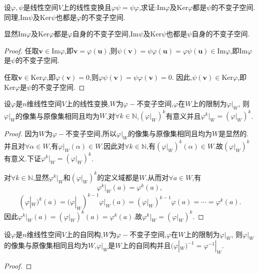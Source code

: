 \documentclass[../../main.tex]{subfiles}
\begin{document}
\begin{proposition}\label{proposition:乘法可交换的线性变换值域和核互为不变子空间}
设\(\varphi,\psi\)是线性空间\(V\)上的线性变换且\(\varphi\psi = \psi\varphi\),求证:\(\text{Im}\varphi\)及\(\text{Ker}\varphi\)都是\(\psi\)的不变子空间.同理,\(\text{Im}\psi\)及\(\text{Ker}\psi\)也都是\(\varphi\)的不变子空间.
\end{proposition}
\begin{note}
显然\(\text{Im}\varphi\)及\(\text{Ker}\varphi\)都是\(\varphi\)自身的不变子空间,\(\text{Im}\psi\)及\(\text{Ker}\psi\)也都是\(\psi\)自身的不变子空间.
\end{note}
\begin{proof}
任取\(\boldsymbol{v}\in\text{Im}\varphi\),即\(\boldsymbol{v}=\varphi(\boldsymbol{u})\),则\(\psi(\boldsymbol{v})=\psi\varphi(\boldsymbol{u})=\varphi\psi(\boldsymbol{u})\in\text{Im}\varphi\),即\(\text{Im}\varphi\)是\(\psi\)的不变子空间.

任取\(\boldsymbol{v}\in\text{Ker}\varphi\),即\(\varphi(\boldsymbol{v}) = 0\),则\(\varphi\psi(\boldsymbol{v})=\psi\varphi(\boldsymbol{v}) = 0\). 因此,\(\psi(\boldsymbol{v})\in\text{Ker}\varphi\),即\(\text{Ker}\varphi\)是\(\psi\)的不变子空间.
\end{proof}

\begin{proposition}\label{proposition:线性变换在其不变子空间下的限制}
设\(\varphi\)是\(n\)维线性空间\(V\)上的线性变换,\(W\)为\(\varphi -\)不变子空间,\(\varphi\)在\(W\)上的限制为\(\varphi|_W\),
则\(\varphi|_W\)的像集与原像集相同且均为\(W\),对\(\forall k\in \mathbb{N}\),\((\varphi|_W)^k\)有意义并且\(\varphi^k|_W = (\varphi|_W)^k\).    
\end{proposition}
\begin{proof}
因为\(W\)为\(\varphi -\)不变子空间,所以\(\varphi|_W\)的像集与原像集相同且均为\(W\)是显然的.
并且对\(\forall \alpha \in W\),有\(\varphi|_W(\alpha) \in W\).因此对\(\forall k \in \mathbb{N}\),有\((\varphi|_W)^k(\alpha) \in W\).故\((\varphi|_W)^k\)有意义.下证\(\varphi^k|_W = (\varphi|_W)^k\).

对\(\forall k\in \mathbb{N}\),显然\(\varphi^k|_W\)和\((\varphi|_W)^k\)的定义域都是\(W\).从而对\(\forall a\in W\),有
\[
\varphi^k|_W(a)=\varphi^k(a),
\]
\[
(\varphi|_W)^k(a)=(\varphi|_W)^{k - 1}\varphi|_W(a)=(\varphi|_W)^{k - 1}\varphi(a)=\cdots=\varphi^k(a).
\]
因此\(\varphi^k|_W(a)=(\varphi|_W)^k(a)=\varphi^k(a)\).故\(\varphi^k|_W = (\varphi|_W)^k\).
\end{proof}

\begin{proposition}\label{proposition:自同构在其不变子空间下的限制}
设\(\varphi\)是\(n\)维线性空间\(V\)上的自同构,\(W\)为\(\varphi -\)不变子空间,\(\varphi\)在\(W\)上的限制为\(\varphi|_W\),
则\(\varphi|_W\)的像集与原像集相同且均为\(W\),\(\varphi|_W\)是\(W\)上的自同构并且\((\varphi|_W)^{-1} = \varphi^{-1}|_W\).
\end{proposition}
\begin{proof}

\end{proof}
\end{document}
